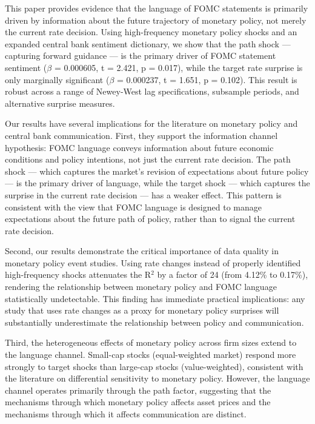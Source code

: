 This paper provides evidence that the language of FOMC statements is primarily driven by information about the future trajectory of monetary policy, not merely the current rate decision. Using high-frequency monetary policy shocks and an expanded central bank sentiment dictionary, we show that the path shock --- capturing forward guidance --- is the primary driver of FOMC statement sentiment ($\beta$ = 0.000605, t = 2.421, p = 0.017), while the target rate surprise is only marginally significant ($\beta$ = 0.000237, t = 1.651, p = 0.102). This result is robust across a range of Newey-West lag specifications, subsample periods, and alternative surprise measures.

Our results have several implications for the literature on monetary policy and central bank communication. First, they support the information channel hypothesis: FOMC language conveys information about future economic conditions and policy intentions, not just the current rate decision. The path shock --- which captures the market's revision of expectations about future policy --- is the primary driver of language, while the target shock --- which captures the surprise in the current rate decision --- has a weaker effect. This pattern is consistent with the view that FOMC language is designed to manage expectations about the future path of policy, rather than to signal the current rate decision.

Second, our results demonstrate the critical importance of data quality in monetary policy event studies. Using rate changes instead of properly identified high-frequency shocks attenuates the R$^2$ by a factor of 24 (from 4.12\% to 0.17\%), rendering the relationship between monetary policy and FOMC language statistically undetectable. This finding has immediate practical implications: any study that uses rate changes as a proxy for monetary policy surprises will substantially underestimate the relationship between policy and communication.

Third, the heterogeneous effects of monetary policy across firm sizes extend to the language channel. Small-cap stocks (equal-weighted market) respond more strongly to target shocks than large-cap stocks (value-weighted), consistent with the literature on differential sensitivity to monetary policy. However, the language channel operates primarily through the path factor, suggesting that the mechanisms through which monetary policy affects asset prices and the mechanisms through which it affects communication are distinct.

